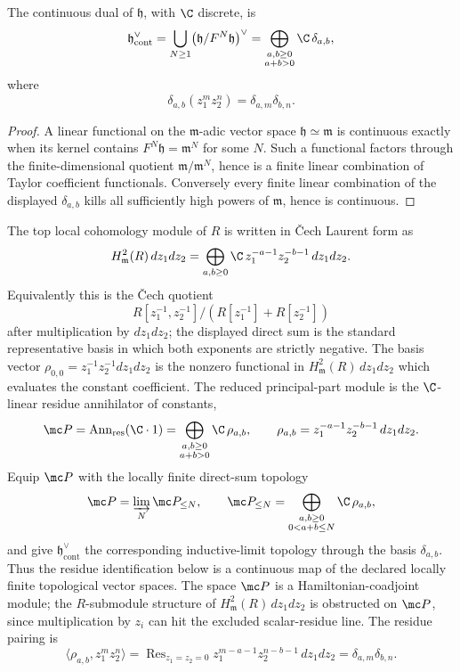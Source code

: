 \begin{lem}
\label{lem:app-matlis-continuous-dual}
  The continuous dual of \(\mathfrak h\), with \(\C\) discrete, is
  \[
    \mathfrak h^\vee_{\mathrm{cont}}
      =\bigcup_{N\geq1}\bigl(\mathfrak h/F^N\mathfrak h\bigr)^\vee
      =\bigoplus_{\substack{a,b\geq0\\a+b>0}}\C\,\delta_{a,b},
  \]
  where
  \[
    \delta_{a,b}(z_1^m z_2^n)=\delta_{a,m}\delta_{b,n}.
  \]
\end{lem}

\begin{proof}
  A linear functional on the \(\mathfrak m\)-adic vector space
  \(\mathfrak h\simeq\mathfrak m\) is continuous exactly when its
  kernel contains \(F^N\mathfrak h=\mathfrak m^N\) for some \(N\).
  Such a functional factors through the finite-dimensional quotient
  \(\mathfrak m/\mathfrak m^N\), hence is a finite linear combination
  of Taylor coefficient functionals.  Conversely every finite linear
  combination of the displayed \(\delta_{a,b}\) kills all sufficiently
  high powers of \(\mathfrak m\), hence is continuous.
\end{proof}

\begin{defn}
\label{def:app-matlis-principal-parts}
  The top local cohomology module of \(R\) is written in \v{C}ech
  Laurent form as
  \[
    H^2_{\mathfrak m}(R)\,dz_1dz_2
      =\bigoplus_{a,b\geq0}
        \C\,z_1^{-a-1}z_2^{-b-1}\,dz_1dz_2 .
  \]
  Equivalently this is the \v{C}ech quotient
  \[
    R[z_1^{-1},z_2^{-1}]/(R[z_1^{-1}]+R[z_2^{-1}])
  \]
  after multiplication by \(dz_1dz_2\); the displayed direct sum is
  the standard representative basis in which both exponents are
  strictly negative.
  The basis vector \(\rho_{0,0}=z_1^{-1}z_2^{-1}dz_1dz_2\) is the nonzero
  functional in \(H^2_{\mathfrak m}(R)\,dz_1dz_2\) which evaluates
  the constant coefficient.  The reduced principal-part module is the
  \(\C\)-linear residue annihilator of constants,
  \[
    \mc P=\operatorname{Ann}_{\mathrm{res}}(\C\cdot1)
      =\bigoplus_{\substack{a,b\geq0\\a+b>0}}\C\,\rho_{a,b},
      \qquad
    \rho_{a,b}=z_1^{-a-1}z_2^{-b-1}\,dz_1dz_2 .
  \]
  Equip \(\mc P\) with the locally finite direct-sum topology
  \[
    \mc P=\varinjlim_N \mc P_{\leq N},\qquad
    \mc P_{\leq N}
      =\bigoplus_{\substack{a,b\geq0\\0<a+b\leq N}}\C\,\rho_{a,b},
  \]
  and give \(\mathfrak h^\vee_{\mathrm{cont}}\) the corresponding
  inductive-limit topology through the basis \(\delta_{a,b}\). Thus the
  residue identification below is a continuous map of the declared
  locally finite topological vector spaces.  The space \(\mc P\) is a Hamiltonian-coadjoint module;
  the \(R\)-submodule structure of \(H^2_{\mathfrak m}(R)\,dz_1dz_2\) is
  obstructed on \(\mc P\), since
  multiplication by \(z_i\) can hit the excluded scalar-residue line.
  The residue pairing is
  \[
    \langle \rho_{a,b},z_1^m z_2^n\rangle
      =\operatorname{Res}_{z_1=z_2=0}
        z_1^{m-a-1}z_2^{n-b-1}\,dz_1dz_2
      =\delta_{a,m}\delta_{b,n}.
  \]
\end{defn}

